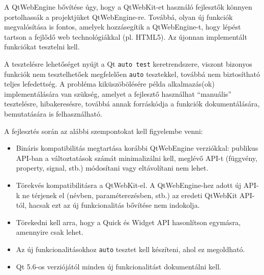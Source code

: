 \documentclass[12pt]{report}
\begin{document}
\noindent
A QtWebEngine bővítése úgy, hogy a QtWebKit-et használó fejlesztők könnyen portolhassák
a projektjüket QtWebEngine-re.
Továbbá, olyan új funkciók megvalósítása is fontos, amelyek hozzásegítik a
QtWebEngine-t, hogy lépést tartson a fejlődő web technológiákkal (pl. HTML5).
Az újonnan implementált funkciókat tesztelni kell.

\bigskip
\noindent
A tesztelésre lehetőséget nyújt a Qt \texttt{auto test}
keretrendszere, viszont bizonyos funkciók nem tesztelhetőek megfelelően \texttt{auto}
tesztekkel, továbbá nem biztosítható teljes lefedettség. A probléma kiküszöbölésére
példa alkalmazás(ok) implementálására van szükség, amelyet a fejlesztő használhat
``manuális'' tesztelésre, hibakeresésre, továbbá annak forráskódja a funkciók
dokumentálására, bemutatására is felhasználható.

\bigskip
\noindent
A fejlesztés során az alábbi szempontokat kell figyelembe venni:
\begin{itemize}
    \item Bináris kompatibilitás megtartása korábbi QtWebEngine verziókkal:
        publikus API-ban a változtatások számát minimalizálni kell,
        meglévő API-t (függvény, property, signal, stb.) módosítani vagy eltávolítani
        nem lehet.
    \item Törekvés kompatibilitásra a QtWebKit-el.
        A QtWebEngine-hez adott új API-k ne térjenek el (névben, paraméterezésben, stb.)
        az eredeti QtWebKit API-tól, hacsak ezt az új funkcionalitás bővítése nem indokolja.
    \item Törekedni kell arra, hogy a Quick és Widget API hasonlítson egymásra,
        amennyire csak lehet.
    \item Az új funkcionalitásokhoz \texttt{auto} tesztet kell készíteni,
        ahol ez megoldható.
    \item Qt 5.6-os verziójától minden új funkcionalitást dokumentálni kell.
\end{itemize}
\end{document}
